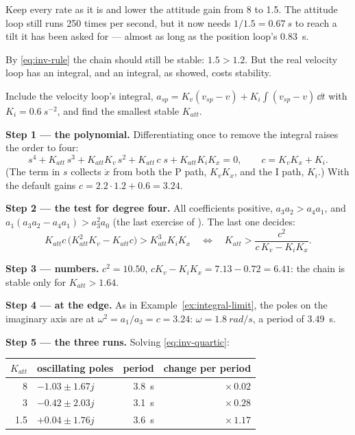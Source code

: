 Keep every rate as it is and lower the attitude gain from 8 to 1.5. The attitude loop still runs 250 times per second, but it now needs $1/1.5 = \SI{0.67}{s}$ to reach a tilt it has been asked for — almost as long as the position loop's \SI{0.83}{s}.

By \cref{eq:inv-rule} the chain should still be stable: $1.5 > 1.2$. But the real velocity loop has an integral, and an integral, as  showed, costs stability.

\begin{example}
\label{ex:inv-quartic}
Include the velocity loop's integral, $a_{sp} = K_v(v_{sp} - v) + K_i\!\int(v_{sp} - v)\,\dd t$ with $K_i = \SI{0.6}{s^{-2}}$, and find the smallest stable $K_{att}$.

\textbf{Step 1 — the polynomial.} Differentiating once to remove the integral raises the order to four:
\begin{equation}\label{eq:inv-quartic}
  s^4 + K_{att}\,s^3 + K_{att}K_v\,s^2 + K_{att}\,c\;s + K_{att}K_iK_x = 0, \qquad c = K_vK_x + K_i .
\end{equation}
(The term in $s$ collects $\dot x$ from both the P path, $K_vK_x$, and the I path, $K_i$.) With the default gains $c = 2.2 \cdot 1.2 + 0.6 = 3.24$.

\textbf{Step 2 — the test for degree four.} All coefficients positive, $a_3a_2 > a_4a_1$, and $a_1(a_3a_2 - a_4a_1) > a_3^2a_0$ (the last exercise of ). The last one decides:
\begin{equation*}
  K_{att}c\,\big(K_{att}^2K_v - K_{att}c\big) > K_{att}^3K_iK_x
  \quad\Longleftrightarrow\quad
  K_{att} > \frac{c^2}{c\,K_v - K_iK_x} .
\end{equation*}

\textbf{Step 3 — numbers.} $c^2 = 10.50$, $cK_v - K_iK_x = 7.13 - 0.72 = 6.41$: the chain is stable only for $K_{att} > 1.64$.

\textbf{Step 4 — at the edge.} As in Example~\ref{ex:integral-limit}, the poles on the imaginary axis are at $\omega^2 = a_1/a_3 = c = 3.24$: $\omega = \SI{1.8}{rad/s}$, a period of \SI{3.49}{s}.

\textbf{Step 5 — the three runs.} Solving \cref{eq:inv-quartic}:
\begin{center}\small\sffamily
\begin{tabular}{rlrr}
\toprule
$K_{att}$ & oscillating poles & period & change per period\\
\midrule
8 & $-1.03 \pm 1.67j$ & \SI{3.8}{s} & $\times\,0.02$\\
3 & $-0.42 \pm 2.03j$ & \SI{3.1}{s} & $\times\,0.28$\\
1.5 & $+0.04 \pm 1.76j$ & \SI{3.6}{s} & $\times\,1.17$\\
\bottomrule
\end{tabular}
\end{center}


\end{example}
